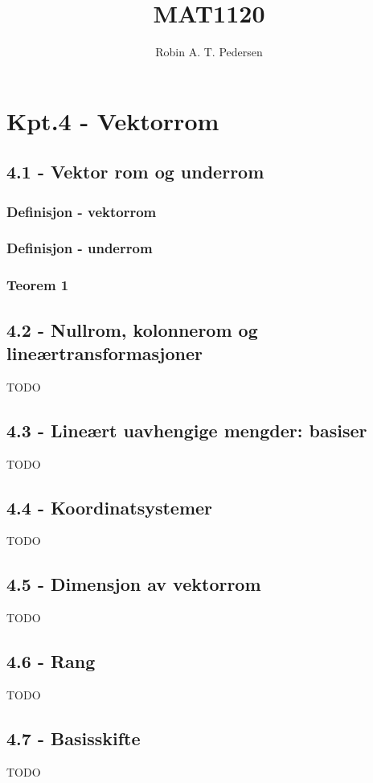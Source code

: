 \documentclass{article}
\begin{document}
  \title{MAT1120}
  \author{Robin A. T. Pedersen}
  \maketitle
  \tableofcontents

  \section{Kpt.4 - Vektorrom}
    \subsection{4.1 - Vektor rom og underrom}
      \subsubsection{Definisjon - vektorrom}
        
      \subsubsection{Definisjon - underrom}
        
      \subsubsection{Teorem 1}
        
    \subsection{4.2 - Nullrom, kolonnerom og lineærtransformasjoner}
      TODO
    \subsection{4.3 - Lineært uavhengige mengder: basiser}
      TODO
    \subsection{4.4 - Koordinatsystemer}
      TODO
    \subsection{4.5 - Dimensjon av vektorrom}
      TODO
    \subsection{4.6 - Rang}
      TODO
    \subsection{4.7 - Basisskifte}
      TODO
\end{document}
